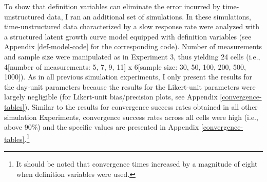 \documentclass[
12pt, %
twoside,
english]{guelphthesis}
\begin{document}
To show that definition variables can eliminate the error incurred by time-unstructured data, I ran an additional set of simulations. In these simulations, time-unstructured data characterized by a slow response rate were analyzed with a structured latent growth curve model equipped with definition variables (see Appendix \ref{def-model-code} for the corresponding code). Number of measurements and sample size were manipulated as in Experiment 3, thus yielding 24 cells (i.e., 4{[}number of measurements: 5, 7, 9, 11{]} x 6{[}sample size: 30, 50, 100, 200, 500, 1000{]}). As in all previous simulation experiments, I only present the results for the day-unit parameters because the results for the Likert-unit parameters were largely negligible (for Likert-unit bias/precision plots, see Appendix \ref{convergence-tables}). Similar to the results for convergence success rates obtained in all other simulation Experiments, convergence success rates across all cells were high (i.e., above 90\%) and the specific values are presented in Appendix \ref{convergence-tables}.\footnote{It should be noted that convergence times increased by a magnitude of eight when definition variables were used.}
\end{document}
